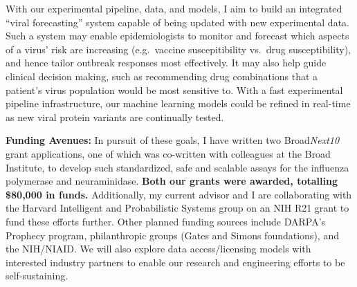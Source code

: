 With our experimental pipeline, data, and models, I aim to build an
integrated ``viral forecasting'' system capable of being updated with
new experimental data. Such a system may enable epidemiologists to
monitor and forecast which aspects of a virus' risk are increasing
(e.g.~vaccine suscepitibility vs.~drug susceptibility), and hence tailor
outbreak responses most effectively. It may also help guide clinical
decision making, such as recommending drug combinations that a patient's
virus population would be most sensitive to. With a fast experimental
pipeline infrastructure, our machine learning models could be refined in
real-time as new viral protein variants are continually tested.

\textbf{Funding Avenues:} In pursuit of these goals, I have written two
Broad\emph{Next10} grant applications, one of which was co-written with
colleagues at the Broad Institute, to develop such standardized, safe
and scalable assays for the influenza polymerase and neuraminidase.
\textbf{Both our grants were awarded, totalling \$80,000 in funds.}
Additionally, my current advisor and I are collaborating with the
Harvard Intelligent and Probabilistic Systems group on an NIH R21 grant
to fund these efforts further. Other planned funding sources include
DARPA's Prophecy program, philanthropic groups (Gates and Simons
foundations), and the NIH/NIAID. We will also explore data
access/licensing models with interested industry partners to enable our
research and engineering efforts to be self-sustaining.
